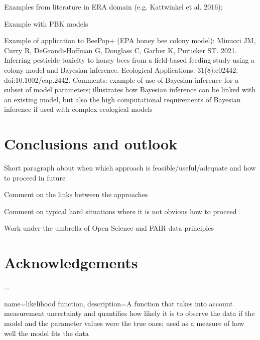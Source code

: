 \documentclass [english,11pt]{article} %
\begin{document}
Examples from literature in ERA domain (e.g. Kattwinkel et al. 2016);

Example with PBK models \citep{Gestin2021,Gestin2022}


Example of application to BeePop+ (EPA honey bee colony model): Minucci JM, Curry R, DeGrandi-Hoffman G, Douglass C, Garber K, Purucker ST. 2021. Inferring pesticide toxicity to honey bees from a field-based feeding study using a colony model and Bayesian inference. Ecological Applications. 31(8):e02442. doi:10.1002/eap.2442.
Comments: example of use of Bayesian inference for a subset of model parameters; illustrates how Bayesian inference can be linked with an existing model, but also the high computational requirements of Bayesian inference if used with complex ecological models


\newpage 

\section*{Conclusions and outlook}

Short paragraph about when which approach is feasible/useful/adequate and how to proceed in future

Comment on the links between the approaches

Comment on typical hard situations where it is not obvious how to proceed

Work under the umbrella of Open Science and FAIR data principles

\section*{Acknowledgements} 
...


{
    name=likelihood function,
    description={A function that takes into account measurement uncertainty and quantifies how likely it is to observe the data if the model and the parameter values were the true ones; used as a measure of how well the model fits the data}
}
\end{document}
